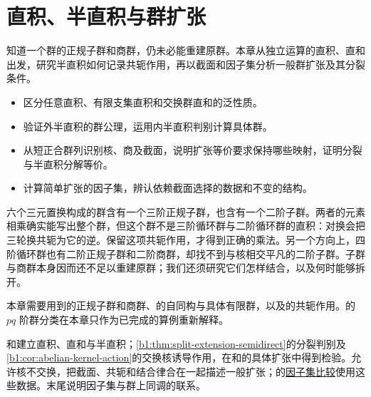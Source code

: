 
\chapter{直积、半直积与群扩张}
\label{b1:ch:06}

\begin{chapterabstract}
	知道一个群的正规子群和商群，仍未必能重建原群。本章从独立运算的直积、直和出发，研究半直积如何记录共轭作用，再以截面和因子集分析一般群扩张及其分裂条件。
\end{chapterabstract}

\begin{learninggoals}
	\begin{itemize}
		\item 区分任意直积、有限支集直积和交换群直和的泛性质。
		\item 验证外半直积的群公理，运用内半直积判别计算具体群。
		\item 从短正合群列识别核、商及截面，说明扩张等价要求保持哪些映射，证明分裂与半直积分解等价。
		\item 计算简单扩张的因子集，辨认依赖截面选择的数据和不变的结构。
	\end{itemize}
\end{learninggoals}

六个三元置换构成的群含有一个三阶正规子群，也含有一个二阶子群。两者的元素相乘确实能写出整个群，但这个群不是三阶循环群与二阶循环群的直积：对换会把三轮换共轭为它的逆。保留这项共轭作用，才得到正确的乘法。另一个方向上，四阶循环群也有二阶正规子群和二阶商群，却找不到与核相交平凡的二阶子群。子群与商群本身因而还不足以重建原群；我们还须研究它们怎样结合，以及何时能够拆开。

\ProseParagraphBreak

本章需要用到的正规子群和商群、的自同构与具体有限群，以及的共轭作用。的 \(pq\) 阶群分类在本章只作为已完成的算例重新解释。

\ProseParagraphBreak
{}和建立直积、直和与半直积；\cref{b1:thm:split-extension-semidirect}的分裂判别及\cref{b1:cor:abelian-kernel-action}的交换核诱导作用，在和的具体扩张中得到检验。允许核不交换，把截面、共轭和结合律合在一起描述一般扩张；的\hyperlink{b1:factor-comparison-deep}{因子集比较}使用这些数据。末尾说明因子集与群上同调的联系。

